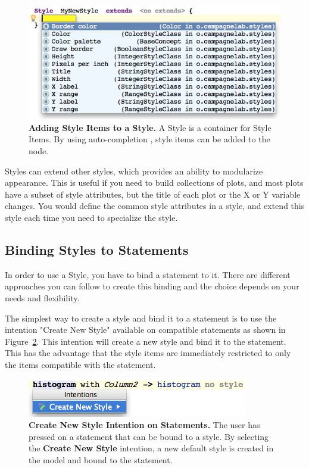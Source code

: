 \begin{figure}[h!tbp]
  \centering
  \includegraphics[width=\figWidthWide]{figures/NewStyleWithElements.png}
\caption[Adding Style Items to a Style.]{\textbf{Adding Style Items to a Style.} A Style is a container for Style Items. By using auto-completion \keys{\ctrl+\space}, style items can be added to the node.}
\label{fig:NewStyleWithElements}
\end{figure}

Styles can extend other styles, which provides an ability to modularize appearance. This is useful if you need to build collections of plots, and most plots have a subset of style attributes, but the title of each plot or the X or Y variable changes. You would define the common style attributes in a style, and extend this style each time you need to specialize the style.

\subsection{Binding Styles to Statements}

In order to use a Style, you have to bind a statement to it. There are different approaches you can follow to create this binding and the choice depends on your needs and flexibility.  

The simplest way to create a style and bind it to a statement is to use the intention "Create New Style" available on compatible statements as shown in Figure~\ref{fig:CreateStyleIntention}. This intention will create a new style and bind it to the statement. This has the advantage that the style items are immediately restricted to only the items compatible with the statement.

\begin{figure}[h!tbp]
  \centering
  \includegraphics[width=\figWidthNarrow]{figures/CreateStyleIntention.png}
\caption[Create New Style on Statements.]{\textbf{Create New Style Intention on Statements.} The user has pressed  on a statement that can be bound to a style. By selecting the \textbf{Create New Style} intention, a new default style is created in the model and bound to the statement.}
\label{fig:CreateStyleIntention}
\end{figure}

